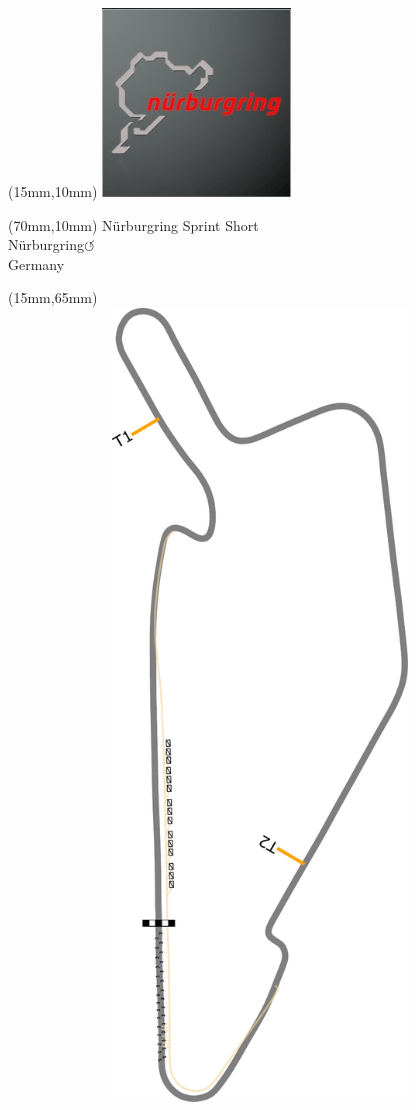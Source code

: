 \null\newpage
\begin{textblock*}{50mm}(15mm,10mm)%
\includegraphics[width=50mm]{LG/2015-05-20_00089.png}
\end{textblock*}
\begin{textblock*}{130mm}(70mm,10mm)%
{\fontsize{20}{20}\selectfont Nürburgring Sprint Short\\}
{\fontsize{16}{16}\selectfont Nürburgring\hfill \huge$\circlearrowleft$\\}
{\fontsize{12}{12}\selectfont Germany\\}
\end{textblock*}
\begin{textblock*}{185mm}(15mm,65mm)%
\centering
\mbox{\includegraphics[width=185mm,height=210mm,keepaspectratio]{PT/NBRSPS.pdf}}
\end{textblock*}
